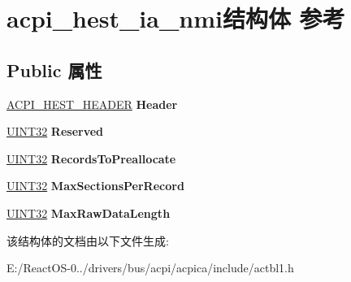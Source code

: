\hypertarget{structacpi__hest__ia__nmi}{}\section{acpi\+\_\+hest\+\_\+ia\+\_\+nmi结构体 参考}
\label{structacpi__hest__ia__nmi}
\subsection*{Public 属性}
\begin{DoxyCompactItemize}
\item 
\mbox{\label{structacpi__hest__ia__nmi_a6e8b30e51f562bf19a9ac66b5e0aec4b}} 
\hyperlink{structacpi__hest__header}{A\+C\+P\+I\+\_\+\+H\+E\+S\+T\+\_\+\+H\+E\+A\+D\+ER} {\bfseries Header}
\item 
\mbox{\label{structacpi__hest__ia__nmi_ae461d672d5ced7ebc5a50b919c134a50}} 
\hyperlink{_processor_bind_8h_ae1e6edbbc26d6fbc71a90190d0266018}{U\+I\+N\+T32} {\bfseries Reserved}
\item 
\mbox{\label{structacpi__hest__ia__nmi_a34c55d69fc807dd8fdfc705f1f707cde}} 
\hyperlink{_processor_bind_8h_ae1e6edbbc26d6fbc71a90190d0266018}{U\+I\+N\+T32} {\bfseries Records\+To\+Preallocate}
\item 
\mbox{\label{structacpi__hest__ia__nmi_a6223630b447f5864d7f28e5f255197b6}} 
\hyperlink{_processor_bind_8h_ae1e6edbbc26d6fbc71a90190d0266018}{U\+I\+N\+T32} {\bfseries Max\+Sections\+Per\+Record}
\item 
\mbox{\label{structacpi__hest__ia__nmi_a8af9f0438c36894749b408f31d3bf615}} 
\hyperlink{_processor_bind_8h_ae1e6edbbc26d6fbc71a90190d0266018}{U\+I\+N\+T32} {\bfseries Max\+Raw\+Data\+Length}
\end{DoxyCompactItemize}


该结构体的文档由以下文件生成\+:\begin{DoxyCompactItemize}
\item 
E\+:/\+React\+O\+S-\/0../drivers/bus/acpi/acpica/include/actbl1.\+h\end{DoxyCompactItemize}

